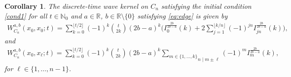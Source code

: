 \documentclass[reqno,10pt]{amsart}
\newtheorem{corollary}[theorem]{Corollary}
\theoremstyle{definition}
\numberwithin{equation}{section}
\begin{document}
\begin{corollary}\label{cor:Cn}
The discrete-time wave kernel on $C_n$ satisfying the initial condition \eqref{cond1} for all $t\in\mathbb N_0$ and $a\in\mathbb R$, $b\in\mathbb R\setminus \{0\}$ satisfying \eqref{eq:edge} is given by
\begin{equation}\label{W_C_n}
\begin{split}
W_{C_n}^{a,b}(x_0,x_0;t)
=
\sum_{k=0}^{\lfloor t/2 \rfloor}
(-1)^k
\binom{t}{2k}
(2b-a)^k
\Bigg(
I_0^{\frac{2b}{2b-a}}(k)
+
2\sum_{j=1}^{\lfloor k/n \rfloor}
(-1)^{jn}
I_{jn}^{\frac{2b}{2b-a}}(k)
\Bigg),
\end{split}
\end{equation}
and
\begin{equation}\label{W_C_n at x_l}
\begin{split}
W_{C_n}^{a,b}(x_0,x_\ell;t)
=
\sum_{k=0}^{\lfloor t/2 \rfloor}
(-1)^k
\binom{t}{2k}
(2b-a)^k
\underset{n\mid m\pm \ell}{\sum_{m\in\{1,\ldots,k\}}}
(-1)^{m}
I_{m}^{\frac{2b}{2b-a}}(k),
\end{split}
\end{equation}
for $\ell\in\{1,\ldots,n-1\}$.

\end{corollary}
\end{document}
